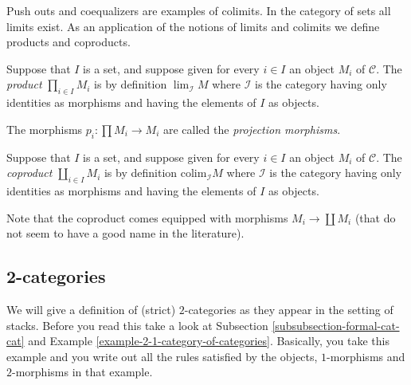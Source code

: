\noindent
Push outs and coequalizers are examples of colimits.
In the category of sets all limits exist.
As an application of the notions of limits and colimits
we define products and coproducts.

\begin{definition}
\label{definition-product}
Suppose that $I$ is a set, and suppose given for every $i \in I$ an
object $M_i$ of $\mathcal{C}$. The {\it product} $\prod_{i\in I} M_i$
is by definition $\lim_{\mathcal{I}} M$ where $\mathcal{I}$ is the
category having only identities as morphisms and having the
elements of $I$ as objects.
\end{definition}

\noindent
The morphisms $p_i : \prod M_i \to M_i$ are called the
{\it projection morphisms}.

\begin{definition}
\label{definition-coproduct}
Suppose that $I$ is a set, and suppose given for every $i \in I$ an
object $M_i$ of $\mathcal{C}$. The {\it coproduct} $\coprod_{i\in I} M_i$
is by definition $\text{colim}_{\mathcal{I}} M$ where $\mathcal{I}$ is the
category having only identities as morphisms and having the
elements of $I$ as objects.
\end{definition}

\noindent
Note that the coproduct comes equipped with morphisms
$M_i \to \coprod M_i$ (that do not seem to have a good
name in the literature).

\subsection{2-categories}
\label{subsection-2-categories}

\noindent
We will give a definition of (strict) $2$-categories as they appear
in the setting of stacks. Before you read this take a look at
Subsection \ref{subsubsection-formal-cat-cat} and Example
\ref{example-2-1-category-of-categories}. Basically, you take this example
and you write out all the rules satisfied by the objects, $1$-morphisms
and $2$-morphisms in that example.

